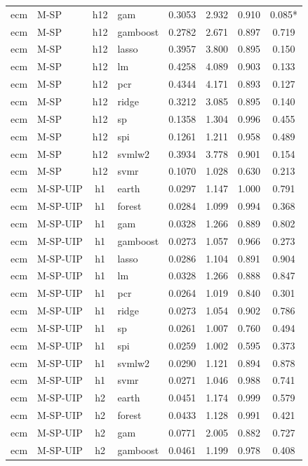 \begin{ThreePartTable}
\begin{longtable}[t]{llclcccc}
ecm & M-SP & h12 & gam & 0.3053 & 2.932 & 0.910 & 0.085*\\
ecm & M-SP & h12 & gamboost & 0.2782 & 2.671 & 0.897 & 0.719\\
ecm & M-SP & h12 & lasso & 0.3957 & 3.800 & 0.895 & 0.150\\
ecm & M-SP & h12 & lm & 0.4258 & 4.089 & 0.903 & 0.133\\
ecm & M-SP & h12 & pcr & 0.4344 & 4.171 & 0.893 & 0.127\\
ecm & M-SP & h12 & ridge & 0.3212 & 3.085 & 0.895 & 0.140\\
ecm & M-SP & h12 & sp & 0.1358 & 1.304 & 0.996 & 0.455\\
ecm & M-SP & h12 & spi & 0.1261 & 1.211 & 0.958 & 0.489\\
ecm & M-SP & h12 & svmlw2 & 0.3934 & 3.778 & 0.901 & 0.154\\
ecm & M-SP & h12 & svmr & 0.1070 & 1.028 & 0.630 & 0.213\\
\addlinespace
ecm & M-SP-UIP & h1 & earth & 0.0297 & 1.147 & 1.000 & 0.791\\
ecm & M-SP-UIP & h1 & forest & 0.0284 & 1.099 & 0.994 & 0.368\\
ecm & M-SP-UIP & h1 & gam & 0.0328 & 1.266 & 0.889 & 0.802\\
ecm & M-SP-UIP & h1 & gamboost & 0.0273 & 1.057 & 0.966 & 0.273\\
ecm & M-SP-UIP & h1 & lasso & 0.0286 & 1.104 & 0.891 & 0.904\\
ecm & M-SP-UIP & h1 & lm & 0.0328 & 1.266 & 0.888 & 0.847\\
ecm & M-SP-UIP & h1 & pcr & 0.0264 & 1.019 & 0.840 & 0.301\\
ecm & M-SP-UIP & h1 & ridge & 0.0273 & 1.054 & 0.902 & 0.786\\
ecm & M-SP-UIP & h1 & sp & 0.0261 & 1.007 & 0.760 & 0.494\\
ecm & M-SP-UIP & h1 & spi & 0.0259 & 1.002 & 0.595 & 0.373\\
ecm & M-SP-UIP & h1 & svmlw2 & 0.0290 & 1.121 & 0.894 & 0.878\\
ecm & M-SP-UIP & h1 & svmr & 0.0271 & 1.046 & 0.988 & 0.741\\
\addlinespace
ecm & M-SP-UIP & h2 & earth & 0.0451 & 1.174 & 0.999 & 0.579\\
ecm & M-SP-UIP & h2 & forest & 0.0433 & 1.128 & 0.991 & 0.421\\
ecm & M-SP-UIP & h2 & gam & 0.0771 & 2.005 & 0.882 & 0.727\\
ecm & M-SP-UIP & h2 & gamboost & 0.0461 & 1.199 & 0.978 & 0.408\\

\end{longtable}
\end{ThreePartTable}
